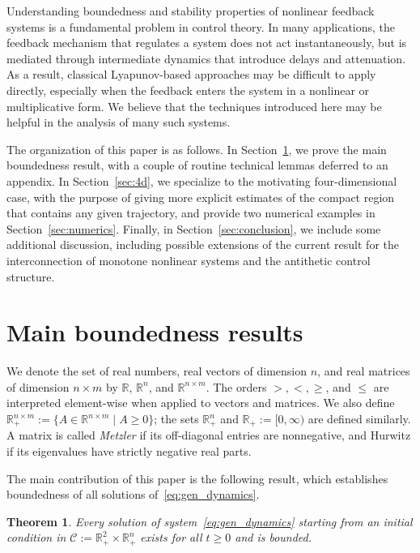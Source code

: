 \documentclass{article}
\newtheorem{theorem}{Theorem}
\begin{document}
Understanding boundedness and stability properties of nonlinear feedback systems is a fundamental problem in control theory. In many applications, the feedback mechanism that regulates a system does not act instantaneously, 
but is mediated through intermediate dynamics that introduce delays and attenuation. As a result, classical Lyapunov-based approaches may be difficult to apply directly, especially when the feedback enters the system 
in a nonlinear or multiplicative form. We believe that the techniques introduced here may be helpful in the analysis of many such systems.

The organization of this paper is as follows.
In Section~\ref{sec:general}, we prove the main boundedness result, with a couple of routine technical lemmas deferred to an appendix.
In Section~\ref{sec:4d}, we specialize to the motivating four-dimensional case, with the purpose of giving more explicit estimates of the compact region that contains any given trajectory, and provide two numerical examples in Section~\ref{sec:numerics}.
Finally, in Section~\ref{sec:conclusion}, we include some additional discussion, including possible extensions of the current result for the interconnection of monotone nonlinear systems and the antithetic control structure.

\section{Main boundedness results}\label{sec:general}

We denote the set of real numbers, real vectors of dimension $n$, and 
real matrices of dimension $n\times m$ by $\mathbb{R}$, $\mathbb{R}^n$, 
and $\mathbb{R}^{n\times m}$. The orders $>,<,\geq$, and $\leq$ are 
interpreted element-wise when applied to vectors and matrices. We also define $\mathbb{R}_+^{n\times m}:=\{A\in\mathbb{R}^{n\times m}\mid A\ge 0\}$; 
the sets $\mathbb{R}_+^{n}$ and $\mathbb{R}_+:=[0,\infty)$ are defined similarly. A 
matrix is called \emph{Metzler} if its off-diagonal entries are nonnegative, and Hurwitz if its eigenvalues have strictly negative real parts.

The main contribution of this paper is the following result, which 
establishes boundedness of all solutions of~\eqref{eq:gen_dynamics}.

\begin{theorem}\label{thm:main}
    Every solution of system~\eqref{eq:gen_dynamics} starting from an initial 
    condition in $\mathcal{C} := \mathbb{R}^2_+ \times \mathbb{R}^n_+$ exists for all $t\ge 0$ and is bounded.
\end{theorem}
\end{document}
